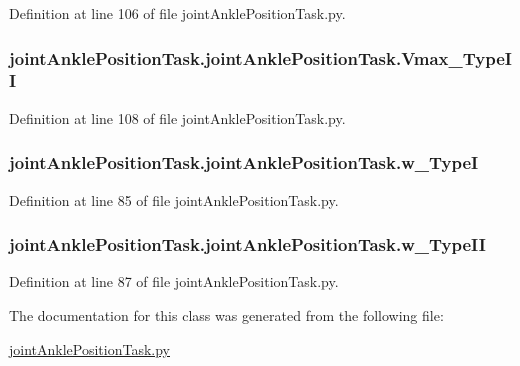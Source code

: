 Definition at line 106 of file joint\+Ankle\+Position\+Task.\+py.

\subsubsection[{\texorpdfstring{Vmax\+\_\+\+Type\+II}{Vmax_TypeII}}]{\setlength{\rightskip}{0pt plus 5cm}joint\+Ankle\+Position\+Task.\+joint\+Ankle\+Position\+Task.\+Vmax\+\_\+\+Type\+II}\hypertarget{classjoint_ankle_position_task_1_1joint_ankle_position_task_a51a476d2a20108b0da46c0308ea2ace9}{}\label{classjoint_ankle_position_task_1_1joint_ankle_position_task_a51a476d2a20108b0da46c0308ea2ace9}


Definition at line 108 of file joint\+Ankle\+Position\+Task.\+py.

\subsubsection[{\texorpdfstring{w\+\_\+\+TypeI}{w_TypeI}}]{\setlength{\rightskip}{0pt plus 5cm}joint\+Ankle\+Position\+Task.\+joint\+Ankle\+Position\+Task.\+w\+\_\+\+TypeI}\hypertarget{classjoint_ankle_position_task_1_1joint_ankle_position_task_a8fc7c0508c579976747f517966f5847f}{}\label{classjoint_ankle_position_task_1_1joint_ankle_position_task_a8fc7c0508c579976747f517966f5847f}


Definition at line 85 of file joint\+Ankle\+Position\+Task.\+py.

\subsubsection[{\texorpdfstring{w\+\_\+\+Type\+II}{w_TypeII}}]{\setlength{\rightskip}{0pt plus 5cm}joint\+Ankle\+Position\+Task.\+joint\+Ankle\+Position\+Task.\+w\+\_\+\+Type\+II}\hypertarget{classjoint_ankle_position_task_1_1joint_ankle_position_task_af9dda184ecf14f8440214f75cdd16139}{}\label{classjoint_ankle_position_task_1_1joint_ankle_position_task_af9dda184ecf14f8440214f75cdd16139}


Definition at line 87 of file joint\+Ankle\+Position\+Task.\+py.



The documentation for this class was generated from the following file\+:\begin{DoxyCompactItemize}
\item 
\hyperlink{joint_ankle_position_task_8py}{joint\+Ankle\+Position\+Task.\+py}\end{DoxyCompactItemize}
